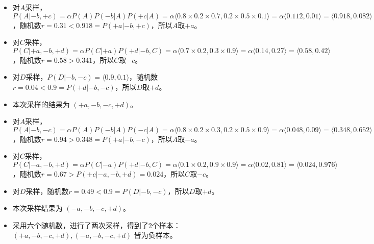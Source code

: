 \begin{enumerate}
\begin{solution}
\begin{itemize}
            \item 对$A$采样，$P(A| -b,+c)=\alpha P(A)P(-b|A)P(+c|A)=\alpha\langle 0.8\times 0.2\times 0.7, 0.2\times 0.5\times 0.1 \rangle=\alpha\langle 0.112, 0.01\rangle=\langle 0.918,0.082\rangle$，随机数$r=0.31<0.918=P(+a|-b,+c)$，所以$A$取$+a$。
            \item 对$C$采样，$P(C| +a,-b,+d)=\alpha P(C|+a)P(+d|-b,C)=\alpha\langle 0.7\times 0.2, 0.3\times 0.9 \rangle=\alpha\langle 0.14,0.27 \rangle=\langle 0.58,0.42\rangle$，随机数$r=0.58>0.341$，所以$C$取$-c$。
            \item 对$D$采样，$P(D| -b,-c)=\langle 0.9,0.1 \rangle$，随机数 $r=0.04<0.9=P(+d|-b,-c)$，所以$D$取$+d$。
            \item 本次采样的结果为 $(+a,-b,-c,+d)$。
            \item 对$A$采样，$P(A| -b,-c)=\alpha P(A)P(-b|A)P(-c|A)=\alpha\langle 0.8\times 0.2\times 0.3, 0.2\times 0.5\times 0.9 \rangle=\alpha\langle 0.048,0.09\rangle=\langle 0.348,0.652\rangle$，随机数$r=0.94>0.348=P(+a|-b,-c)$，所以$A$取$-a$。
            \item 对$C$采样，$P(C| -a,-b,+d)=\alpha P(C|-a)P(+d|-b,C)=\alpha\langle 0.1\times 0.2, 0.9\times 0.9\rangle=\alpha\langle 0.02,0.81 \rangle=\langle 0.024,0.976 \rangle$，随机数$r=0.67>P(+c|-a,-b,+d)=0.024$，所以$C$取$-c$。
            \item 对$D$采样，随机数$r=0.49<0.9=P(D|-b,-c)$，所以$D$取$+d$。
            \item 本次采样结果为 $(-a,-b,-c,+d)$。
            \item 采用六个随机数，进行了两次采样，得到了2个样本：$(+a,-b,-c,+d), (-a, -b, -c, +d)$ 皆为负样本。
        \end{itemize}
    \end{solution}
\end{enumerate}

